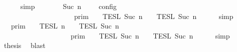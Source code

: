 \begin{isabellebody}
\ \ \ \ \isamarkupfalse%
\ simp\isanewline
\ \ \isamarkupfalse%
\ \isamarkupfalse%
\ {\isacartoucheopen}{\isasymlbrakk}\ {\isasymGamma}{\isacharcomma}\ Suc\ n\ {\isasymTurnstile}\ {\isasymPhi}\ {\isasymtriangleright}\ {\isacharbrackleft}{\isacharbrackright}\ {\isasymrbrakk}\isactrlsub c\isactrlsub o\isactrlsub n\isactrlsub f\isactrlsub i\isactrlsub g\isanewline
\ \ \ \ \ \ \ \ \ \ \ \ \ \ \ \ \ \ {\isacharequal}\ {\isasymlbrakk}{\isasymlbrakk}\ {\isasymGamma}\ {\isasymrbrakk}{\isasymrbrakk}\isactrlsub p\isactrlsub r\isactrlsub i\isactrlsub m\ {\isasyminter}\ {\isasymlbrakk}{\isasymlbrakk}\ {\isasymPhi}\ {\isasymrbrakk}{\isasymrbrakk}\isactrlsub T\isactrlsub E\isactrlsub S\isactrlsub L\isactrlbsup {\isasymge}\ Suc\ n\isactrlesup \ {\isasyminter}\ {\isasymlbrakk}{\isasymlbrakk}\ {\isacharbrackleft}{\isacharbrackright}\ {\isasymrbrakk}{\isasymrbrakk}\isactrlsub T\isactrlsub E\isactrlsub S\isactrlsub L\isactrlbsup {\isasymge}\ Suc\ n\isactrlesup {\isacartoucheclose}\isanewline
\ \ \ \ \isamarkupfalse%
\ simp\isanewline
\ \ \isamarkupfalse%
\ \isamarkupfalse%
\ {\isacartoucheopen}{\isasymlbrakk}{\isasymlbrakk}\ {\isasymGamma}\ {\isasymrbrakk}{\isasymrbrakk}\isactrlsub p\isactrlsub r\isactrlsub i\isactrlsub m\ {\isasyminter}\ {\isasymlbrakk}{\isasymlbrakk}\ {\isacharbrackleft}{\isacharbrackright}\ {\isasymrbrakk}{\isasymrbrakk}\isactrlsub T\isactrlsub E\isactrlsub S\isactrlsub L\isactrlbsup {\isasymge}\ n\isactrlesup \ {\isasyminter}\ {\isasymlbrakk}{\isasymlbrakk}\ {\isasymPhi}\ {\isasymrbrakk}{\isasymrbrakk}\isactrlsub T\isactrlsub E\isactrlsub S\isactrlsub L\isactrlbsup {\isasymge}\ Suc\ n\isactrlesup \isanewline
\ \ \ \ \ \ \ \ \ \ \ \ \ \ \ \ \ {\isacharequal}\ {\isasymlbrakk}{\isasymlbrakk}\ {\isasymGamma}\ {\isasymrbrakk}{\isasymrbrakk}\isactrlsub p\isactrlsub r\isactrlsub i\isactrlsub m\ {\isasyminter}\ {\isasymlbrakk}{\isasymlbrakk}\ {\isasymPhi}\ {\isasymrbrakk}{\isasymrbrakk}\isactrlsub T\isactrlsub E\isactrlsub S\isactrlsub L\isactrlbsup {\isasymge}\ Suc\ n\isactrlesup \ {\isasyminter}\ {\isasymlbrakk}{\isasymlbrakk}\ {\isacharbrackleft}{\isacharbrackright}\ {\isasymrbrakk}{\isasymrbrakk}\isactrlsub T\isactrlsub E\isactrlsub S\isactrlsub L\isactrlbsup {\isasymge}\ Suc\ n\isactrlesup {\isacartoucheclose}\isanewline
\ \ \ \ \isamarkupfalse%
\ simp\isanewline
\ \ \isamarkupfalse%
\ \isamarkupfalse%
\ {\isacharquery}thesis\ \isamarkupfalse%
\ blast\isanewline
{}\isamarkupfalse%

\end{isabellebody}
